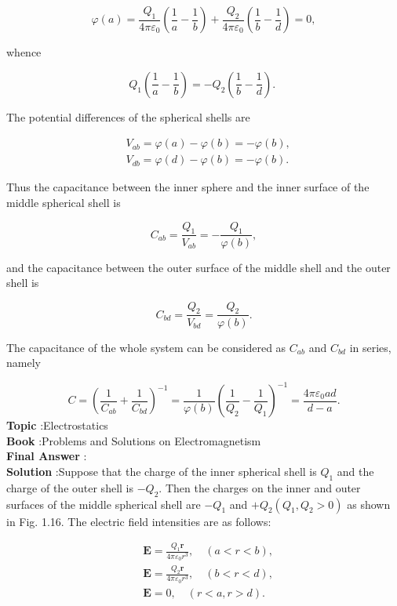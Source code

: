 \documentclass[10pt]{article}
\begin{document}
$$
\varphi(a)=\frac{Q_{1}}{4 \pi \varepsilon_{0}}\left(\frac{1}{a}-\frac{1}{b}\right)+\frac{Q_{2}}{4 \pi \varepsilon_{0}}\left(\frac{1}{b}-\frac{1}{d}\right)=0,
$$

whence

$$
Q_{1}\left(\frac{1}{a}-\frac{1}{b}\right)=-Q_{2}\left(\frac{1}{b}-\frac{1}{d}\right) \text {. }
$$

The potential differences of the spherical shells are

$$
\begin{aligned}
&V_{a b}=\varphi(a)-\varphi(b)=-\varphi(b), \\
&V_{d b}=\varphi(d)-\varphi(b)=-\varphi(b) .
\end{aligned}
$$

Thus the capacitance between the inner sphere and the inner surface of the middle spherical shell is

$$
C_{a b}=\frac{Q_{1}}{V_{a b}}=-\frac{Q_{1}}{\varphi(b)},
$$

and the capacitance between the outer surface of the middle shell and the outer shell is

$$
C_{b d}=\frac{Q_{2}}{V_{b d}}=\frac{Q_{2}}{\varphi(b)} .
$$

The capacitance of the whole system can be considered as $C_{a b}$ and $C_{b d}$ in series, namely

$$
C=\left(\frac{1}{C_{a b}}+\frac{1}{C_{b d}}\right)^{-1}=\frac{1}{\varphi(b)}\left(\frac{1}{Q_{2}}-\frac{1}{Q_{1}}\right)^{-1}=\frac{4 \pi \varepsilon_{0} a d}{d-a} .
$$
\textbf{Topic} :Electrostatics\\
\textbf{Book} :Problems and Solutions on Electromagnetism\\
\textbf{Final Answer} :\\


\textbf{Solution} :Suppose that the charge of the inner spherical shell is $Q_{1}$ and the charge of the outer shell is $-Q_{2}$. Then the charges on the inner and outer surfaces of the middle spherical shell are $-Q_{1}$ and $+Q_{2}\left(Q_{1}, Q_{2}>0\right)$ as shown in Fig. 1.16. The electric field intensities are as follows:

$$
\begin{aligned}
&\mathbf{E}=\frac{Q_{1} \mathbf{r}}{4 \pi \varepsilon_{0} r^{3}}, \quad(a<r<b), \\
&\mathbf{E}=\frac{Q_{2} \mathbf{r}}{4 \pi \varepsilon_{0} r^{3}}, \quad(b<r<d), \\
&\mathbf{E}=0, \quad(r<a, r>d) .
\end{aligned}
$$
\end{document}
